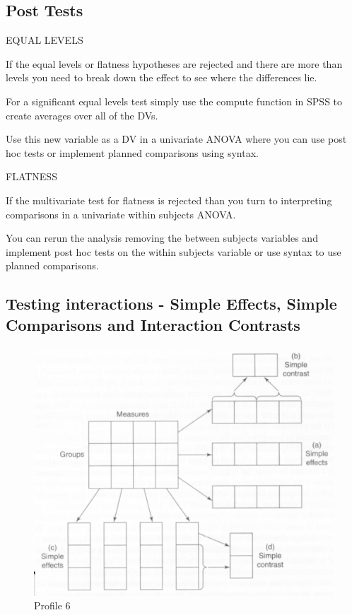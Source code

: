 \documentclass[]{book}
\theoremstyle{definition}
\theoremstyle{definition}
\theoremstyle{definition}
\theoremstyle{remark}
\begin{document}
{\subsection{Post Tests}\label{post-tests}

EQUAL LEVELS

If the equal levels or flatness hypotheses are rejected and there are
more than levels you need to break down the effect to see where the
differences lie.

For a significant equal levels test simply use the compute function in
SPSS to create averages over all of the DVs.

Use this new variable as a DV in a univariate ANOVA where you can use
post hoc tests or implement planned comparisons using syntax.

FLATNESS

If the multivariate test for flatness is rejected than you turn to
interpreting comparisons in a univariate within subjects ANOVA.

You can rerun the analysis removing the between subjects variables and
implement post hoc tests on the within subjects variable or use syntax
to use planned comparisons.

\subsection{Testing interactions - Simple Effects, Simple Comparisons
and Interaction
Contrasts}\label{testing-interactions---simple-effects-simple-comparisons-and-interaction-contrasts}

\begin{figure}
\centering
\includegraphics{img/jhprofile6.png}
\caption{Profile 6}
\end{figure}

}
\end{document}
